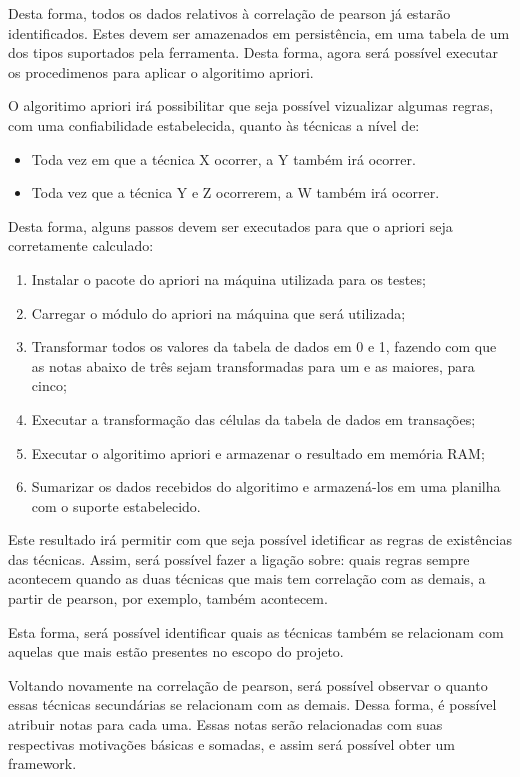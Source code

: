 Desta forma, todos os dados relativos à correlação de pearson já estarão identificados. Estes devem ser amazenados em persistência,
em uma tabela de um dos tipos suportados pela ferramenta. Desta forma, agora será possível executar os procedimenos para aplicar
o algoritimo apriori.

O algoritimo apriori irá possibilitar que seja possível vizualizar algumas regras, com uma confiabilidade estabelecida,
quanto às técnicas a nível de:
\begin{itemize}
    \item Toda vez em que a técnica X ocorrer, a Y também irá ocorrer.
    \item Toda vez que a técnica Y e Z ocorrerem, a W também irá ocorrer.
\end{itemize}

Desta forma, alguns passos devem ser executados para que o apriori seja corretamente calculado:

\begin{enumerate}
    \item Instalar o pacote do apriori na máquina utilizada para os testes;
    \item Carregar o módulo do apriori na máquina que será utilizada;
    \item Transformar todos os valores da tabela de dados em 0 e 1, fazendo com que as notas abaixo de três
        sejam transformadas para um e as maiores, para cinco;
    \item Executar a transformação das células da tabela de dados em transações;
    \item Executar o algoritimo apriori e armazenar o resultado em memória RAM;
    \item Sumarizar os dados recebidos do algoritimo e armazená-los em uma planilha com o suporte
        estabelecido.
\end{enumerate}

Este resultado irá permitir com que seja possível idetificar as regras de existências das técnicas. Assim, será possível fazer
a ligação sobre: quais regras sempre acontecem quando as duas técnicas que mais tem correlação com as demais, a partir de pearson,
por exemplo, também acontecem.


Esta forma, será possível identificar quais as técnicas também se relacionam com aquelas que mais estão presentes no escopo do
projeto.

Voltando novamente na correlação de pearson, será possível observar o quanto essas técnicas secundárias se relacionam com as demais. 
Dessa forma, é possível atribuir notas para cada uma. Essas notas serão relacionadas com suas respectivas motivações básicas e somadas, e assim
será possível obter um framework.

